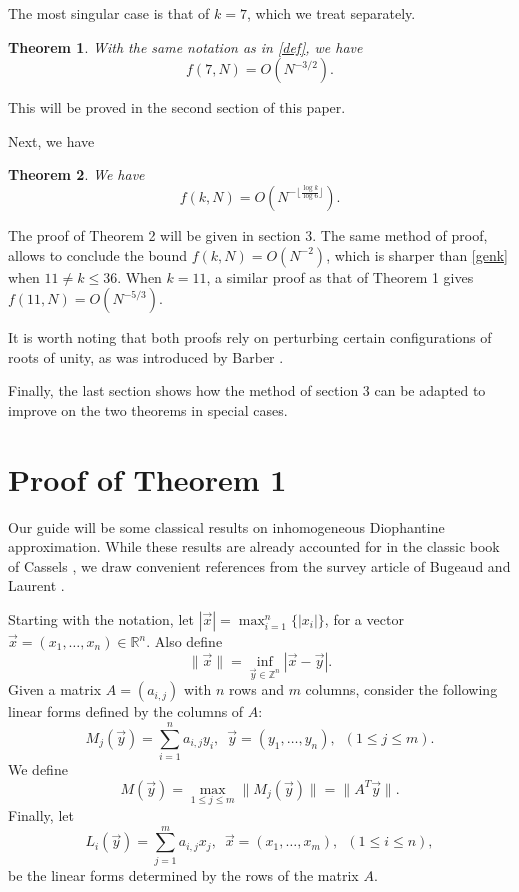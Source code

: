\documentclass[12pt]{article}
\newtheorem{theorem}{Theorem}
\theoremstyle{definition}
\newcommand{\Z}{\mathbb{Z}}
\begin{document}
The most singular case is that of $k=7$, which we treat separately.

\begin{theorem}
    With the same notation as in \eqref{def}, we have
    \begin{equation}\label{7result}
        f(7,N)=O(N^{-3/2}).
    \end{equation}
\end{theorem}
This will be proved in the second section of this paper.

Next, we have
\begin{theorem}
    We have
    \begin{equation}\label{genk}
        f(k,N)=O(N^{-\lfloor \frac{\log k}{\log 6} \rfloor}).
    \end{equation}
\end{theorem}
The proof of Theorem 2 will be given in section 3. The same method of proof, allows to conclude the bound $f(k,N)=O(N^{-2})$, which is sharper than \eqref{genk} when $11\neq k\leq 36$. When $k=11$, a similar proof as that of Theorem 1 gives $f(11,N)=O(N^{-5/3})$. 

It is worth noting that both proofs rely on perturbing certain configurations of roots of unity, as was introduced by Barber \cite{benb}.

Finally, the last section shows how the method of section 3 can be adapted to improve on the two theorems in special cases.

\section{Proof of Theorem 1}
Our guide will be some classical results on inhomogeneous Diophantine approximation. While these results are already accounted for in the classic book of Cassels \cite{cassels}, we draw convenient references from the survey article of Bugeaud and Laurent \cite{transfer}.

Starting with the notation, let $|\vec{x}|=\max_{i=1}^n\{|x_i| \}$, for a vector $\vec{x}=(x_1,\dots, x_n)\in \mathbb{R}^n$. Also define
\begin{equation*}
    \| \vec{x} \|=\inf_{\vec{y}\in \Z^n}|\vec{x}-\vec{y}|.
\end{equation*}
Given a matrix $A=(a_{i,j})$ with $n$ rows and $m$ columns, consider the following linear forms defined by the columns of $A$:
\begin{equation}
    M_j(\vec{y})=\sum_{i=1}^n a_{i,j}y_i,\,\,\, \vec{y}=(y_1,\dots,y_n)   ,\,\,\, (1\leq j \leq m).
\end{equation}
We define
\begin{equation}
    M(\vec{y})=\max_{1\leq j \leq m}\| M_j(\vec{y}) \|=\|A^T\vec{y}\|.
\end{equation}
Finally, let 
\begin{equation}
    L_i(\vec{y})=\sum_{j=1}^m a_{i,j}x_j,\,\,\, \vec{x}=(x_1,\dots,x_m)   ,\,\,\, (1\leq i \leq n),
\end{equation}
be the linear forms determined by the rows of the matrix $A$. 
\end{document}
